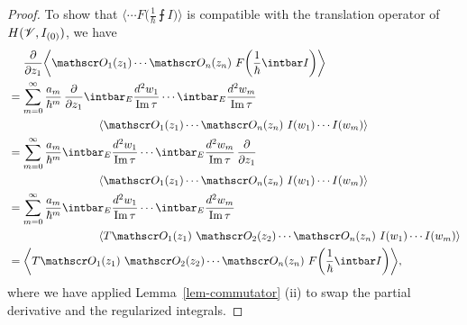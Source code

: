 \begin{proof}
    To show that
    $\bigl\langle \cdots F \bigl( \frac{1}{\hbar} \intbar I \bigr) \bigr\rangle$
    is compatible with the translation operator of
    $H (\mathscr{V}, I_{(0)})$, we have
    \begin{align*}
        & \phantom{{} = {}}
        \frac {\partial} {\partial z_1}
        \biggl\langle
            \scrO_1 (z_1) \cdots \scrO_n (z_n) \ 
            F \biggl( \frac{1}{\hbar} \intbar I \biggr)
        \biggr\rangle \\
        & =
        \sum _{m = 0} ^{\infty}
        \frac {a_m} {\hbar^m} \,
        \frac {\partial} {\partial z_1}
        \intbar_E \frac {d^2 w_1} {\im \tau}
        \cdots
        \intbar_E \frac {d^2 w_m} {\im \tau} \\
        & \hspace{8em}
        \langle
            \scrO_1 (z_1) \cdots \scrO_n (z_n) \ 
            I (w_1) \cdots I (w_m)
        \rangle \\
        & =
        \sum _{m = 0} ^{\infty}
        \frac {a_m} {\hbar^m} 
        \intbar_E \frac {d^2 w_1} {\im \tau}
        \cdots
        \intbar_E \frac {d^2 w_m} {\im \tau} \,
        \frac {\partial} {\partial z_1} \\
        & \hspace{8em}
        \langle
            \scrO_1 (z_1) \cdots \scrO_n (z_n) \ 
            I (w_1) \cdots I (w_m)
        \rangle \\
        & =
        \sum _{m = 0} ^{\infty}
        \frac {a_m} {\hbar^m} 
        \intbar_E \frac {d^2 w_1} {\im \tau}
        \cdots
        \intbar_E \frac {d^2 w_m} {\im \tau} \\
        & \hspace{8em}
        \langle
            T \scrO_1 (z_1) \ 
            \scrO_2 (z_2) \cdots \scrO_n (z_n) \ 
            I (w_1) \cdots I (w_m)
        \rangle \\
        & =
        \biggl\langle
            T \scrO_1 (z_1) \ 
            \scrO_2 (z_2) \cdots \scrO_n (z_n) \ 
            F \biggl( \frac{1}{\hbar} \intbar I \biggr)
        \biggr\rangle ,
    \end{align*}
    where we have applied Lemma~\ref{lem-commutator} (ii)
    to swap the partial derivative and the regularized integrals.
\end{proof}

